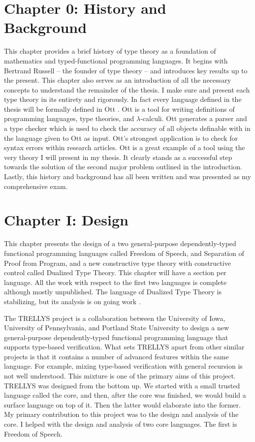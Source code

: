 \section{Chapter 0: History and Background}
\label{sec:history_and_background}
This chapter provides a brief history of type theory as a foundation
of mathematics and typed-functional programming languages.  It begins
with Bertrand Russell -- the founder of type theory -- and introduces
key results up to the present. This chapter also serves as an
introduction of all the necessary concepts to understand the remainder
of the thesis.  I make sure and present each type theory in its
entirety and rigorously.  In fact every language defined in the thesis
will be formally defined in Ott \cite{Sewell:2010}.  Ott is a tool for
writing definitions of programming languages, type theories, and
$\lambda$-calculi.  Ott generates a parser and a type checker which is
used to check the accuracy of all objects definable with in the
language given to Ott as input.  Ott's strongest application is to
check for syntax errors within research articles.  Ott is a great
example of a tool using the very theory I will present in my thesis.
It clearly stands as a successful step towards the solution of the
second major problem outlined in the introduction.  Lastly, this
history and background has all been written and was presented as my
comprehensive exam.

\section{Chapter I: Design}
\label{sec:design}

This chapter presents the design of a two general-purpose
dependently-typed functional programming languages called Freedom of
Speech, and Separation of Proof from Program, and a new constructive
type theory with constructive control called Dualized Type Theory.
This chapter will have a section per language. All the work with
respect to the first two languages is complete although mostly
unpublished.  The language of Dualized Type Theory is stabilizing, but
its analysis is on going work \cite{Stump:2013}.

The TRELLYS project is a collaboration between the University of Iowa,
University of Pennsylvania, and Portland State University to design a
new general-purpose dependently-typed functional programming language
that supports type-based verification.  What sets TRELLYS apart from
other similar projects is that it contains a number of advanced
features within the same language.  For example, mixing type-based
verification with general recursion is not well understood.  This
mixture is one of the primary aims of this project.  TRELLYS was
designed from the bottom up.  We started with a small trusted language
called the core, and then, after the core was finished, we would build
a surface language on top of it. Then the latter would elaborate into
the former.  My primary contribution to this project was to the design
and analysis of the core.  I helped with the design and analysis of
two core languages.  The first is Freedom of Speech.

